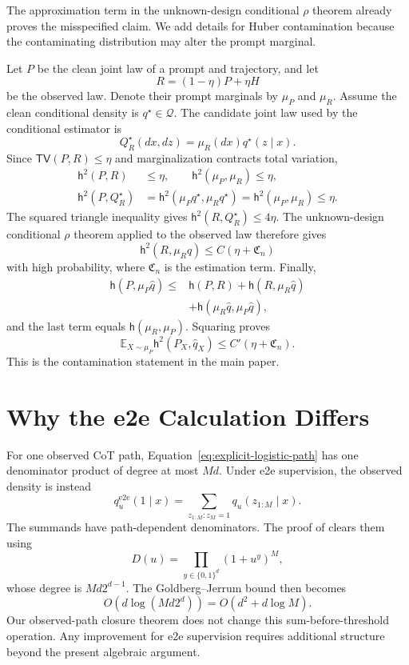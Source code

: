 \documentclass[twoside]{article}
\newcommand{\E}{\mathbb E}
\newcommand{\Q}{\mathcal Q}
\newcommand{\h}{\mathsf h}
\newcommand{\TV}{\mathsf{TV}}
\begin{document}
The approximation term in the unknown-design conditional $\rho$ theorem already proves the misspecified claim. We add details for Huber contamination because the contaminating distribution may alter the prompt marginal.

Let $P$ be the clean joint law of a prompt and trajectory, and let
\[
 R=(1-\eta)P+\eta H
\]
be the observed law. Denote their prompt marginals by $\mu_P$ and $\mu_R$. Assume the clean conditional density is $q^\star\in\Q$. The candidate joint law used by the conditional estimator is
\[
 Q_R^\star(dx,dz)=\mu_R(dx)q^\star(z\mid x).
\]
Since $\TV(P,R)\leq\eta$ and marginalization contracts total variation,
\begin{align*}
 \h^2(P,R)&\leq\eta,\qquad
 \h^2(\mu_P,\mu_R)\leq\eta,\\
 \h^2(P,Q_R^\star)
 &=\h^2(\mu_Pq^\star,\mu_Rq^\star)
 =\h^2(\mu_P,\mu_R)\leq\eta.
\end{align*}
The squared triangle inequality gives $\h^2(R,Q_R^\star)\leq4\eta$. The unknown-design conditional $\rho$ theorem applied to the observed law therefore gives
\[
 \h^2(R,\mu_R\widehat q)\leq C(\eta+\mathfrak C_n)
\]
with high probability, where $\mathfrak C_n$ is the estimation term. Finally,
\begin{align*}
 \h(P,\mu_P\widehat q)
 \leq{}&\h(P,R)+\h(R,\mu_R\widehat q)\\
 &+\h(\mu_R\widehat q,\mu_P\widehat q),
\end{align*}
and the last term equals $\h(\mu_R,\mu_P)$. Squaring proves
\[
 \E_{X\sim\mu_P}\h^2(P_X,\widehat q_X)
 \leq C'(\eta+\mathfrak C_n).
\]
This is the contamination statement in the main paper.

\section{Why the e2e Calculation Differs}
\label{app:e2e}

For one observed CoT path, Equation~\eqref{eq:explicit-logistic-path} has one denominator product of degree at most $Md$. Under e2e supervision, the observed density is instead
\[
 q^{\mathrm{e2e}}_u(1\mid x)
 =\sum_{z_{1:M}:z_M=1}q_u(z_{1:M}\mid x).
\]
The summands have path-dependent denominators. The proof of \citet[Lemma 12]{doron2026stochastic} clears them using
\[
 D(u)=\prod_{y\in\{0,1\}^d}(1+u^y)^M,
\]
whose degree is $Md2^{d-1}$. The Goldberg--Jerrum bound then becomes
\[
 O\!\left(d\log(Md2^d)\right)=O(d^2+d\log M).
\]
Our observed-path closure theorem does not change this sum-before-threshold operation. Any improvement for e2e supervision requires additional structure beyond the present algebraic argument.


\end{document}
